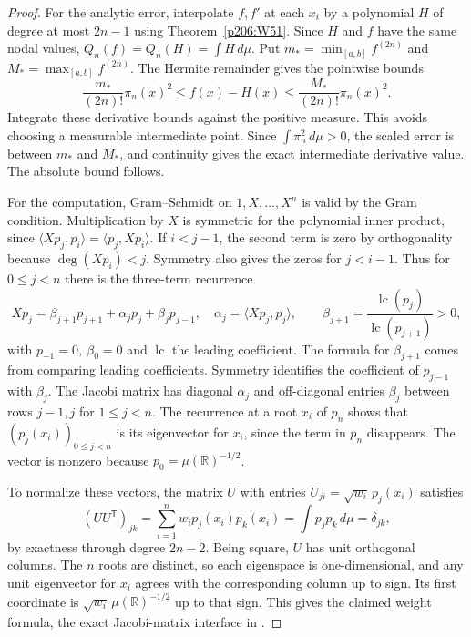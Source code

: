 \documentclass[11pt,oneside,openany]{book}
\theoremstyle{plain}
\theoremstyle{definition}
\theoremstyle{remark}
\begin{document}
\begin{proof}
For the analytic error, interpolate \(f,f'\) at each \(x_i\)
by a polynomial \(H\) of degree at most \(2n-1\) using
Theorem~\ref{p206:W51}. Since \(H\) and \(f\) have the same
nodal values, \(Q_n(f)=Q_n(H)=\int H\,d\mu\).
Put \(m_*=\min_{[a,b]} f^{(2n)}\) and
\(M_*=\max_{[a,b]} f^{(2n)}\).
The Hermite remainder gives the pointwise bounds
\[
  \frac{m_*}{(2n)!}\pi_n(x)^2
  \le f(x)-H(x)
  \le\frac{M_*}{(2n)!}\pi_n(x)^2.
\]
Integrate these derivative bounds against the positive measure.
This avoids choosing a measurable intermediate point. Since
\(\int\pi_n^2\,d\mu>0\), the scaled error is between
\(m_*\) and \(M_*\), and continuity gives the exact
intermediate derivative value. The absolute bound follows.

For the computation, Gram--Schmidt on \(1,X,\ldots,X^n\)
is valid by the Gram condition. Multiplication by \(X\)
is symmetric for the polynomial inner product, since
\(\langle Xp_j,p_i\rangle=\langle p_j,Xp_i\rangle\).
If \(i<j-1\), the second term is zero by orthogonality
because \(\deg(Xp_i)<j\). Symmetry also gives the zeros
for \(j<i-1\). Thus for \(0\le j<n\) there is the
three-term recurrence
\[
 Xp_j=\beta_{j+1}p_{j+1}+\alpha_jp_j+\beta_jp_{j-1},
 \quad
 \alpha_j=\langle Xp_j,p_j\rangle,\qquad
 \beta_{j+1}=\frac{\operatorname{lc}(p_j)}
                   {\operatorname{lc}(p_{j+1})}>0 ,
\]
with \(p_{-1}=0,\ \beta_0=0\) and \(\operatorname{lc}\)
the leading coefficient. The formula for \(\beta_{j+1}\)
comes from comparing leading coefficients. Symmetry
identifies the coefficient of \(p_{j-1}\) with \(\beta_j\).
The Jacobi matrix has diagonal \(\alpha_j\) and off-diagonal
entries \(\beta_j\) between rows \(j-1,j\) for \(1\le j<n\).
The recurrence at a root \(x_i\) of \(p_n\) shows that
\((p_j(x_i))_{0\le j<n}\) is its eigenvector for \(x_i\),
since the term in \(p_n\) disappears. The vector is nonzero
because \(p_0=\mu(\mathbb R)^{-1/2}\).

To normalize these vectors, the matrix \(U\) with entries
\(U_{ji}=\sqrt{w_i}\,p_j(x_i)\) satisfies
\[
 (UU^\mathsf{T})_{jk}=\sum_{i=1}^n w_i p_j(x_i)p_k(x_i)
                     =\int p_jp_k\,d\mu=\delta_{jk},
\]
by exactness through degree \(2n-2\). Being square, \(U\)
has unit orthogonal columns. The \(n\) roots are distinct,
so each eigenspace is one-dimensional, and any unit
eigenvector for \(x_i\) agrees with the corresponding
column up to sign. Its first coordinate is
\(\sqrt{w_i}\,\mu(\mathbb R)^{-1/2}\) up to that sign.
This gives the claimed weight formula, the exact
Jacobi-matrix interface in \cite[Section 4.1]{gautschi}.
\end{proof}
\end{document}
